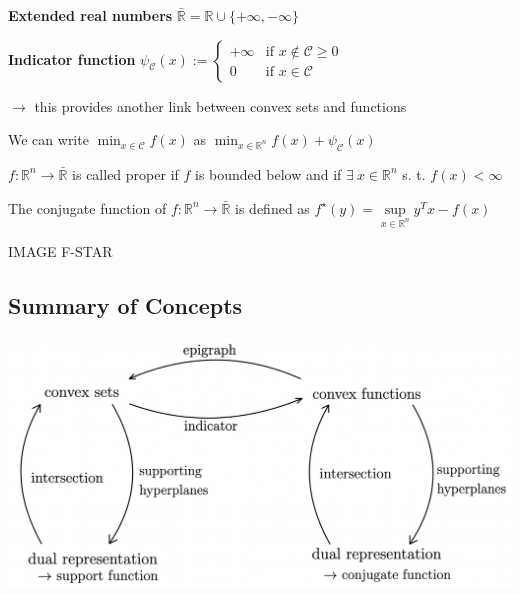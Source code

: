 \textbf{Extended real numbers} $\bar{\mathbb{R}} = \mathbb{R} \cup \{+\infty, -\infty\}$


\textbf{Indicator function}
$\psi_\mathcal{C}(x) := \begin{cases} +\infty &\text{if } x \notin\mathcal{C} \ge 0 \\ 0 &\text{if } x \in\mathcal{C} \end{cases}$

$\rightarrow$ this provides another link between convex sets and functions

We can write
$\min_{x \in \mathcal{C}}f(x)$ as
$\min_{x \in \mathbb{R}^{n}}f(x) + \psi_\mathcal{C}(x)$

\begin{definition}[3]
	$f: \mathbb{R}^{n}\rightarrow\bar{\mathbb{R}}$ is called proper
	if $f$ is bounded below and
	if $\exists\ x \in \mathbb{R}^{n}$ s. t. $f(x)<\infty$
\end{definition}

\begin{definition}
	The conjugate function of $f: \mathbb{R}^{n}\rightarrow\bar{\mathbb{R}}$  is defined as
	$f^\star(y)=\underset{x \in \mathbb{R}^{n}}{\operatorname{sup}}y^T x-f(x)$
\end{definition}

IMAGE F-STAR

\subsection{Summary of Concepts}


\includegraphics[width=\columnwidth]{images/summary_set_functions.png}

\begin{theorem}[THEOREM2?]

\end{theorem}
